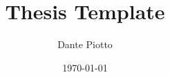 \usepackage{graphicx, amsfonts, float, amsmath, amsthm, xcolor, lipsum, mathtools, cases, caption, subcaption}
\usepackage{hyperref}
\usepackage{geometry}


\usepackage{subfiles}



\newcommand{\R}{\mathbb{R}}
\newcommand{\N}{\mathbb{N}}
\newcommand{\Z}{\mathbb{Z}}
\newcommand{\C}{\mathbb{C}}

\newcommand{\addchaptertoc}[1]{\addcontentsline{toc}{chapter}{#1}} %
\title{Thesis Template}
\author{Dante Piotto}
\date{\today}
